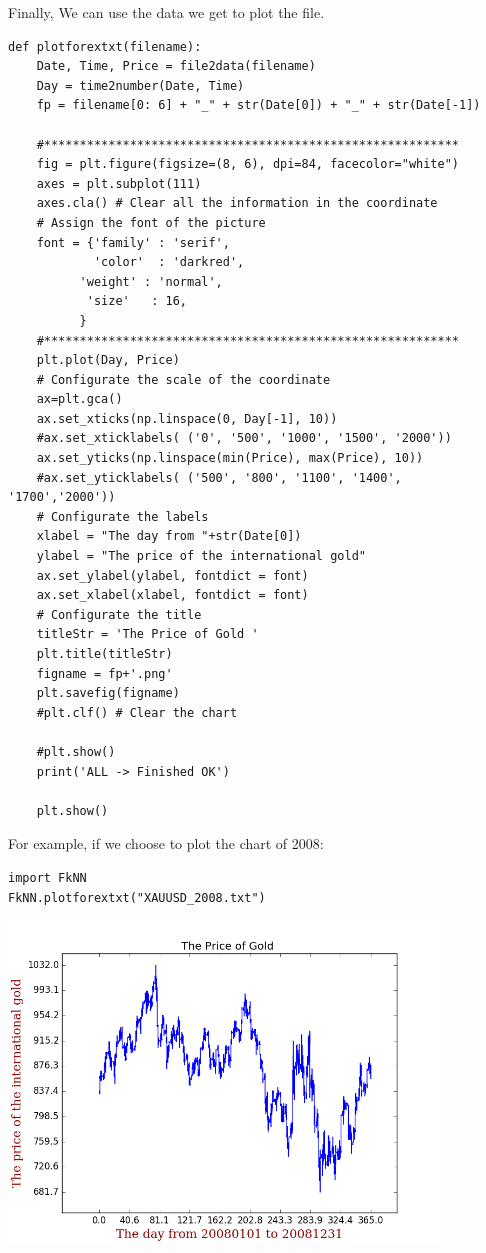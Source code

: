 \documentclass[12pt]{article}
\begin{document}
Finally, We can use the data we get to plot the file.
\begin{lstlisting}
def plotforextxt(filename):
    Date, Time, Price = file2data(filename)
    Day = time2number(Date, Time)
    fp = filename[0: 6] + "_" + str(Date[0]) + "_" + str(Date[-1])

    #**********************************************************
    fig = plt.figure(figsize=(8, 6), dpi=84, facecolor="white")
    axes = plt.subplot(111)
    axes.cla() # Clear all the information in the coordinate
    # Assign the font of the picture
    font = {'family' : 'serif',
            'color'  : 'darkred',
          'weight' : 'normal',
           'size'   : 16,
          }
    #**********************************************************
    plt.plot(Day, Price)
    # Configurate the scale of the coordinate
    ax=plt.gca()
    ax.set_xticks(np.linspace(0, Day[-1], 10))
    #ax.set_xticklabels( ('0', '500', '1000', '1500', '2000'))
    ax.set_yticks(np.linspace(min(Price), max(Price), 10))
    #ax.set_yticklabels( ('500', '800', '1100', '1400', '1700','2000'))
    # Configurate the labels
    xlabel = "The day from "+str(Date[0])
    ylabel = "The price of the international gold"
    ax.set_ylabel(ylabel, fontdict = font)
    ax.set_xlabel(xlabel, fontdict = font)
    # Configurate the title
    titleStr = 'The Price of Gold '
    plt.title(titleStr)
    figname = fp+'.png'
    plt.savefig(figname)
    #plt.clf() # Clear the chart

    #plt.show()
    print('ALL -> Finished OK')

    plt.show()
\end{lstlisting}

For example, if we choose to plot the chart of 2008:
\begin{lstlisting}
import FkNN
FkNN.plotforextxt("XAUUSD_2008.txt")
\end{lstlisting}

\includegraphics[width = 4.5in]{2.png}
\end{document}
